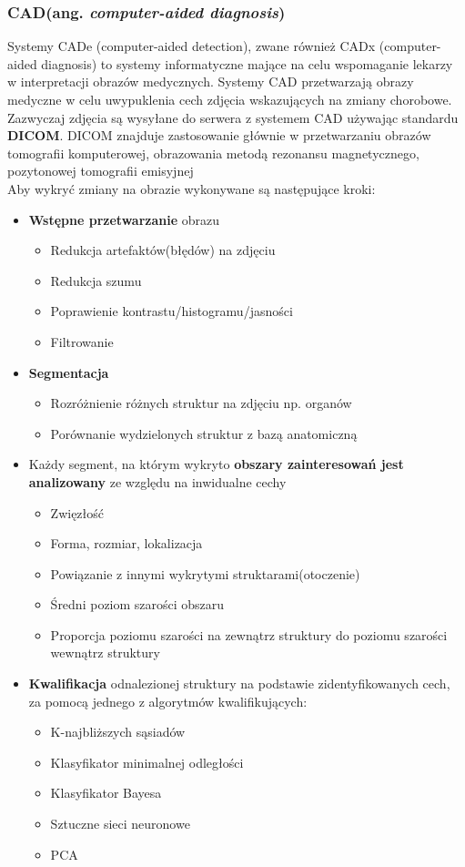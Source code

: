 \subsubsection{CAD(ang. \textit{computer-aided diagnosis})}

Systemy CADe (computer-aided detection), zwane również CADx (computer-aided diagnosis) to systemy informatyczne mające na celu wspomaganie lekarzy w interpretacji obrazów medycznych. Systemy CAD przetwarzają obrazy medyczne w celu uwypuklenia cech zdjęcia wskazujących na zmiany chorobowe. Zazwyczaj zdjęcia są wysyłane do serwera z systemem CAD używając standardu \textbf{DICOM}. DICOM znajduje zastosowanie głównie w przetwarzaniu obrazów tomografii komputerowej, obrazowania metodą rezonansu magnetycznego, pozytonowej tomografii emisyjnej \\

Aby wykryć zmiany na obrazie wykonywane są następujące kroki:
\begin{itemize}
	\item \textbf{Wstępne przetwarzanie} obrazu
	\begin{itemize}
		\item Redukcja artefaktów(błędów) na zdjęciu
		\item Redukcja szumu
		\item Poprawienie kontrastu/histogramu/jasności
		\item Filtrowanie
	\end{itemize}
	\item \textbf{Segmentacja}
	\begin{itemize}
		\item Rozróżnienie różnych struktur na zdjęciu np. organów
		\item Porównanie wydzielonych struktur z bazą anatomiczną
	\end{itemize}
	\item Każdy segment, na którym wykryto \textbf{obszary zainteresowań jest analizowany} ze względu na inwidualne cechy
	\begin{itemize}
		\item Zwięzłość
		\item Forma, rozmiar, lokalizacja
		\item Powiązanie z innymi wykrytymi struktarami(otoczenie)
		\item Średni poziom szarości obszaru
		\item Proporcja poziomu szarości na zewnątrz struktury do poziomu szarości wewnątrz struktury
	\end{itemize}
	\item \textbf{Kwalifikacja} odnalezionej struktury na podstawie zidentyfikowanych cech, za pomocą jednego z algorytmów kwalifikujących:
	\begin{itemize}
		\item K-najbliższych sąsiadów
		\item Klasyfikator minimalnej odległości
		\item Klasyfikator Bayesa
		\item Sztuczne sieci neuronowe
		\item PCA \\
	\end{itemize}
\end{itemize}


